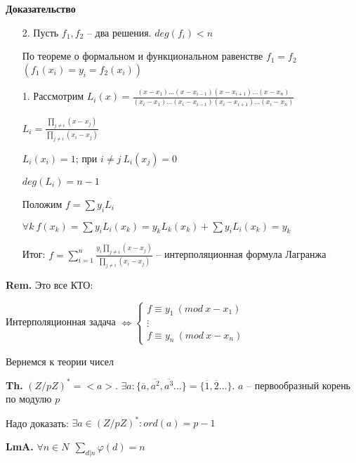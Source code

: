 \documentclass[14pt, letter paper]{article}
\begin{document}
\begin{center}
    \textbf{Доказательство}
\end{center}

\begin{enumerate}
    \item[2.] Пусть $f_1, f_2$ -- два решения. $deg(f_i) < n$

    По теореме о формальном и функциональном равенстве $f_1 = f_2$ $(f_1(x_i) = y_i = f_2(x_i))$

    \item[1.] Рассмотрим $L_i(x) = \frac{(x - x_1)\ldots(x - x_{i-1})(x - x_{i+1}) \ldots (x - x_n)}{(x_i - x_1) \ldots(x_i - x_{i-1})(x_i - x_{i+1}) \ldots (x_i - x_n)}$

    $L_i = \frac{\prod\limits_{j \neq i}(x - x_j)}{\prod\limits_{j \neq i}(x_i - x_j)}$

    $L_i(x_i) = 1$; при $i \neq j\ L_i(x_j) = 0$

    $deg(L_i) = n - 1$

    Положим $f = \sum y_iL_i$

    $\forall k\ f(x_k)  = \sum y_iL_i(x_k) = y_kL_k(x_k) + \sum y_iL_i(x_k) = y_k$

    Итог: $f = \sum\limits_{i = 1}^n \frac{y_i \prod\limits_{j \neq i} (x - x_j)}{\prod\limits_{j \neq i} (x_i - x_j)}$ -- интерполяционная формула Лагранжа
\end{enumerate}

\vspace{3mm}

\textbf{Rem.} Это все КТО:

Интерполяционная задача $\Leftrightarrow \begin{cases}
    f \equiv y_1\ (mod\ x - x_1) \\
    \vdots \\
    f \equiv y_n\ (mod\ x - x_n)
\end{cases}$

\vspace{5mm}

Вернемся к теории чисел

\textbf{Th.} $(Z/pZ)^* = <a>$. $\exists a : \{ \overline{a}, \overline{a^2}, \overline{a^3} \ldots \} = \{ \overline{1}, \overline{2} \ldots\}$. $a$ -- первообразный корень по модулю $p$

Надо доказать: $\exists a \in (Z/pZ)^* : ord(a) = p - 1$

\textbf{LmA.} $\forall n \in N\ \ \sum\limits_{d | n} \varphi(d) = n$
\end{document}
